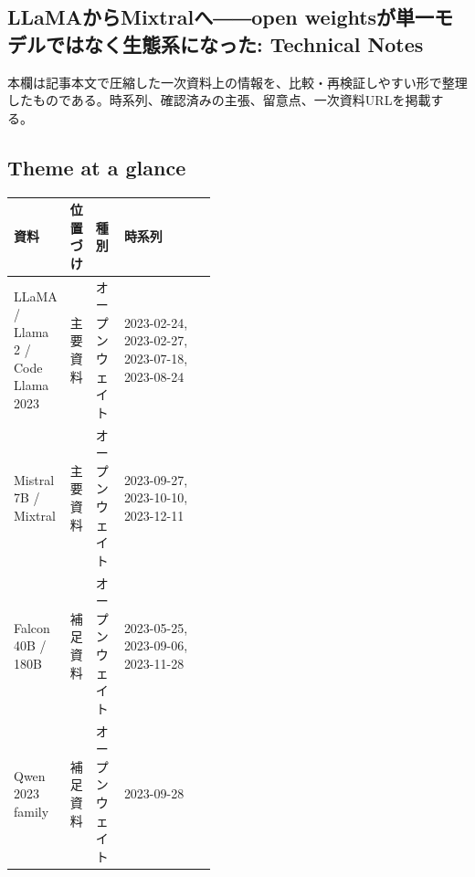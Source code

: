 \subsection*{LLaMAからMixtralへ――open weightsが単一モデルではなく生態系になった: Technical Notes}
本欄は記事本文で圧縮した一次資料上の情報を、比較・再検証しやすい形で整理したものである。時系列、確認済みの主張、留意点、一次資料URLを掲載する。
\smallskip
{}\par
\medskip
\subsection*{Theme at a glance}
\begin{center}
\footnotesize
\begin{tabularx}{\linewidth}{@{}p{0.20\linewidth}p{0.10\linewidth}p{0.14\linewidth}X@{}}
\toprule
資料 & 位置づけ & 種別 & 時系列 \\
\midrule
LLaMA / Llama 2 / Code Llama 2023 & 主要資料 & オープンウェイト & 2023-02-24, 2023-02-27, 2023-07-18, 2023-08-24 \\
Mistral 7B / Mixtral & 主要資料 & オープンウェイト & 2023-09-27, 2023-10-10, 2023-12-11 \\
Falcon 40B / 180B & 補足資料 & オープンウェイト & 2023-05-25, 2023-09-06, 2023-11-28 \\
Qwen 2023 family & 補足資料 & オープンウェイト & 2023-09-28 \\
\bottomrule
\end{tabularx}
\end{center}
\normalsize

